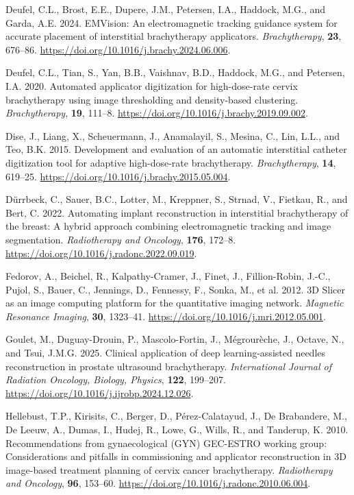 \documentclass[
  11pt,
]{article}
\newlength{\cslhangindent}
\newenvironment{CSLReferences}[2] %
 {\begin{list}{}{%
  \setlength{\itemindent}{0pt}
  \setlength{\leftmargin}{0pt}
  \setlength{\parsep}{0pt}
  \ifodd #1
   \setlength{\leftmargin}{\cslhangindent}
   \setlength{\itemindent}{-1\cslhangindent}
  \fi
  \setlength{\itemsep}{#2\baselineskip}}}
 {\end{list}}
\begin{document}
\begin{CSLReferences}{1}{1}
Deufel, C.L., Brost, E.E., Dupere, J.M., Petersen, I.A., Haddock, M.G.,
and Garda, A.E. 2024. {EMVision}: An electromagnetic tracking guidance
system for accurate placement of interstitial brachytherapy applicators.
\emph{Brachytherapy}, \textbf{23}, 676--86.
\url{https://doi.org/10.1016/j.brachy.2024.06.006}.

Deufel, C.L., Tian, S., Yan, B.B., Vaishnav, B.D., Haddock, M.G., and
Petersen, I.A. 2020. Automated applicator digitization for
high-dose-rate cervix brachytherapy using image thresholding and
density-based clustering. \emph{Brachytherapy}, \textbf{19}, 111--8.
\url{https://doi.org/10.1016/j.brachy.2019.09.002}.

Dise, J., Liang, X., Scheuermann, J., Anamalayil, S., Mesina, C., Lin,
L.L., and Teo, B.K. 2015. Development and evaluation of an automatic
interstitial catheter digitization tool for adaptive high-dose-rate
brachytherapy. \emph{Brachytherapy}, \textbf{14}, 619--25.
\url{https://doi.org/10.1016/j.brachy.2015.05.004}.

Dürrbeck, C., Sauer, B.C., Lotter, M., Kreppner, S., Strnad, V.,
Fietkau, R., and Bert, C. 2022. Automating implant reconstruction in
interstitial brachytherapy of the breast: A hybrid approach combining
electromagnetic tracking and image segmentation. \emph{Radiotherapy and
Oncology}, \textbf{176}, 172--8.
\url{https://doi.org/10.1016/j.radonc.2022.09.019}.

Fedorov, A., Beichel, R., Kalpathy-Cramer, J., Finet, J., Fillion-Robin,
J.-C., Pujol, S., Bauer, C., Jennings, D., Fennessy, F., Sonka, M., et
al. 2012. {3D Slicer} as an image computing platform for the
quantitative imaging network. \emph{Magnetic Resonance Imaging},
\textbf{30}, 1323--41. \url{https://doi.org/10.1016/j.mri.2012.05.001}.

Goulet, M., Duguay-Drouin, P., Mascolo-Fortin, J., Mégrourèche, J.,
Octave, N., and Tsui, J.M.G. 2025. Clinical application of deep
learning-assisted needles reconstruction in prostate ultrasound
brachytherapy. \emph{International Journal of Radiation Oncology,
Biology, Physics}, \textbf{122}, 199--207.
\url{https://doi.org/10.1016/j.ijrobp.2024.12.026}.

Hellebust, T.P., Kirisits, C., Berger, D., Pérez-Calatayud, J., De
Brabandere, M., De Leeuw, A., Dumas, I., Hudej, R., Lowe, G., Wills, R.,
and Tanderup, K. 2010. Recommendations from gynaecological ({GYN})
{GEC-ESTRO} working group: Considerations and pitfalls in commissioning
and applicator reconstruction in {3D} image-based treatment planning of
cervix cancer brachytherapy. \emph{Radiotherapy and Oncology},
\textbf{96}, 153--60.
\url{https://doi.org/10.1016/j.radonc.2010.06.004}.


\end{CSLReferences}
\end{document}
